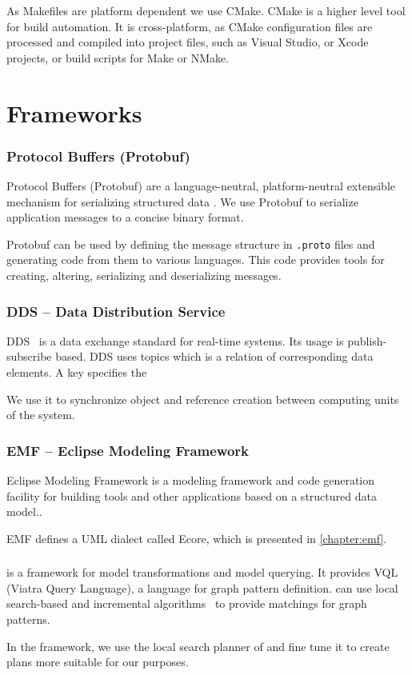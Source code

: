 As Makefiles are platform dependent we use CMake.
CMake is a higher level tool for build automation. 
It is cross-platform, as CMake configuration files are processed and compiled into project files, such as Visual Studio, or Xcode projects, or build scripts for Make or NMake.

\section{Frameworks}

\subsubsection{Protocol Buffers (Protobuf)}
Protocol Buffers (Protobuf) are a language-neutral, platform-neutral extensible mechanism for serializing structured data \cite{protobuf}. 
We use Protobuf to serialize application messages to a concise binary format.

Protobuf can be used by defining the message structure in \texttt{.proto} files and generating code from them to various languages. This code provides tools for creating, altering, serializing and deserializing messages.

\subsubsection{DDS -- Data Distribution Service}

DDS~\cite{DDS} is a data exchange standard for real-time systems. 
Its usage is publish-subscribe based.
DDS uses topics which is a relation of corresponding data elements. 
A key specifies the 

We use it to synchronize object and reference creation between computing units of the system.


\subsubsection{EMF -- Eclipse Modeling Framework}

Eclipse Modeling Framework is a modeling framework and code generation facility for building tools and other applications based on a structured data model.\cite{emf}.

EMF defines a UML dialect called Ecore, which is presented in \autoref{chapter:emf}.



\subsubsection{\protect\viatra{} }


\viatra{} \cite{viatra} is a framework for model transformations and model querying. 
It provides VQL (Viatra Query Language), a language for graph pattern definition.
\viatra{} can use local search-based and incremental algorithms~\cite{viatra-incremental} to provide matchings for graph patterns. 

In the framework, we use the local search planner of \viatra{} and fine tune it to create plans more suitable for our purposes.






